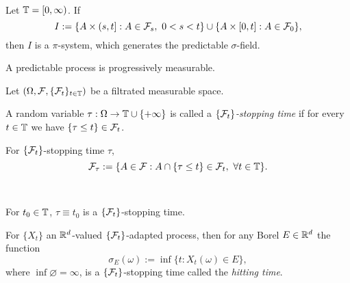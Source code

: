 \documentclass{../../../small}
\begin{document}
\begin{prop}
\,
\begin{parts}
\item Let $\mathbb{T}=[0,\infty)$.
If
\[I:=\{A\times(s,t]:A\in\cF_s,\ 0<s<t\}\cup\{A\times[0,t]:A\in\cF_0\},\]
then $I$ is a $\pi$-system, which generates the predictable $\sigma$-field.
\item A predictable process is progressively measurable.
\end{parts}
\end{prop}

\begin{defn}
Let $(\Omega,\mathcal{F},\{\mathcal{F}_t\}_{t\in\mathbb{T}})$ be a filtrated measurable space.
\begin{parts}
\item
A random variable $\tau:\Omega\to\mathbb{T}\cup\{+\infty\}$ is called a \emph{$\{\mathcal{F}_t\}$-stopping time} if for every $t\in\mathbb{T}$ we have $\{\tau\le t\}\in\mathcal{F}_t$.
\item
For $\{\mathcal{F}_t\}$-stopping time $\tau$,
\[\mathcal{F}_\tau:=\{A\in\mathcal{F}:A\cap\{\tau\le t\}\in\mathcal{F}_t,\ \forall t\in\mathbb{T}\}.\]
\end{parts}
\end{defn}

\begin{rmk}
\,\begin{parts}
\item For $t_0\in\mathbb{T}$, $\tau\equiv t_0$ is a $\{\mathcal{F}_t\}$-stopping time.
\item For $\{X_t\}$ an $\mathbb{R}^d$-valued $\{\mathcal{F}_t\}$-adapted process, then for any Borel $E\in\mathbb{R}^d$ the function
\[\sigma_E(\omega):=\inf\{t:X_t(\omega)\in E\},\]
where $\inf\varnothing=\infty$, is a $\{\mathcal{F}_t\}$-stopping time called the \emph{hitting time}.
\end{parts}
\end{rmk}
\end{document}
